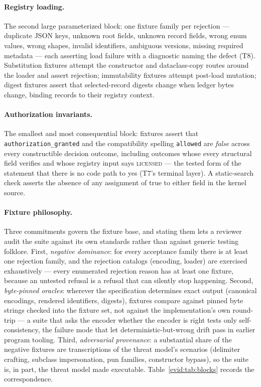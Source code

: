 \paragraph{Registry loading.} The second large parameterized block: one fixture family per rejection --- duplicate JSON keys, unknown root fields, unknown record fields, wrong enum values, wrong shapes, invalid identifiers, ambiguous versions, missing required metadata --- each asserting load failure with a diagnostic naming the defect (T8). Substitution fixtures attempt the constructor and dataclass-copy routes around the loader and assert rejection; immutability fixtures attempt post-load mutation; digest fixtures assert that selected-record digests change when ledger bytes change, binding records to their registry context.

\paragraph{Authorization invariants.} The smallest and most consequential block: fixtures assert that \texttt{authorization\_granted} and the compatibility spelling \texttt{allowed} are \emph{false} across every constructible decision outcome, including outcomes whose every structural field verifies and whose registry input says \textsc{licensed} --- the tested form of the statement that there is no code path to yes (T7's terminal layer). A static-search check asserts the absence of any assignment of true to either field in the kernel source.

\paragraph{Fixture philosophy.} Three commitments govern the fixture base, and stating them lets a reviewer audit the suite against its own standards rather than against generic testing folklore. First, \emph{negative dominance}: for every acceptance family there is at least one rejection family, and the rejection catalogs (encoding, loader) are exercised exhaustively --- every enumerated rejection reason has at least one fixture, because an untested refusal is a refusal that can silently stop happening. Second, \emph{byte-pinned oracles}: wherever the specification determines exact output (canonical encodings, rendered identifiers, digests), fixtures compare against pinned byte strings checked into the fixture set, not against the implementation's own round-trip --- a suite that asks the encoder whether the encoder is right tests only self-consistency, the failure mode that let deterministic-but-wrong drift pass in earlier program tooling. Third, \emph{adversarial provenance}: a substantial share of the negative fixtures are transcriptions of the threat model's scenarios (delimiter crafting, subclass impersonation, pun families, constructor bypass), so the suite is, in part, the threat model made executable. Table~\ref{evid:tab:blocks} records the correspondence.

